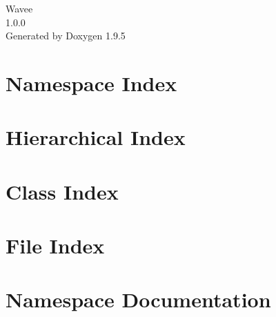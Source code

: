 \documentclass[twoside]{book}
\newcommand{\+}{\discretionary{\mbox{\scriptsize$\hookleftarrow$}}{}{}}
\newcommand{\clearemptydoublepage}{%
    \newpage{\pagestyle{empty}\cleardoublepage}%
  }
\begin{document}
  \raggedbottom
    \hypersetup{pageanchor=false,
                bookmarksnumbered=true,
                pdfencoding=unicode
               }
  \begin{titlepage}
  \vspace*{7cm}
  \begin{center}%
  {\Large Wavee}\\
  [1ex]\large 1.\+0.\+0 \\
  \vspace*{1cm}
  {\large Generated by Doxygen 1.9.5}\\
  \end{center}
  \end{titlepage}
  \clearemptydoublepage
  \tableofcontents
  \clearemptydoublepage
  \hypersetup{pageanchor=true}
\chapter{Namespace Index}

\chapter{Hierarchical Index}

\chapter{Class Index}

\chapter{File Index}

\chapter{Namespace Documentation}

















\end{document}
